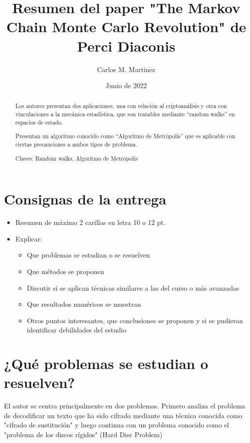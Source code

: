 \documentclass[12pt]{article}
\begin{document}
\title{Resumen del paper "The Markov Chain Monte Carlo Revolution" de Perci Diaconis}
\author{Carlos M. Martinez}
\date{Junio de 2022}

\maketitle

\begin{abstract}
Los autores presentan dos aplicaciones, una con relación al criptoanálisis y otra con vinculaciones a la mecánica estadística, que son tratables mediante ``random walks'' en espacios de estado.

Presentan un algoritmo conocido como ``Algoritmo de Metrópolis'' que es aplicable con ciertas precauciones a ambos tipos de problema.

Claves: Random walks, Algoritmo de Metrópolis

\end{abstract}

\section{Consignas de la entrega}

\begin{itemize}
	\item Resumen de máximo 2 carillas en letra 10 o 12 pt.
	\item Explicar:
		\begin{itemize}
			\item Que problemas se estudian o se resuelven
			\item Que métodos se proponen
			\item Discutir si se aplican técnicas similares a las del curso o más avanzadas
			\item Que resultados numéricos se muestran
			\item Otros puntos interesantes, que conclusiones se proponen y si se pudieran identificar debilidades del estudio
		\end{itemize}

\end{itemize}

\section{¿Qué problemas se estudian o resuelven?}

El autor se centra principalmente en dos problemas. Primero analiza el problema de decodificar un texto que ha sido cifrado mediante una técnica conocida como "cifrado de sustitución" y luego continua con un problema conocido como el "problema de los discos rígidos" (Hard Disc Problem)
\end{document}
